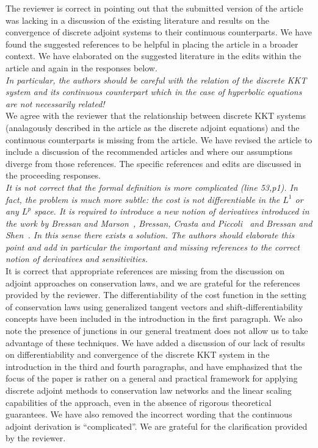 \documentclass[10pt]{article}
\begin{document}
The reviewer is correct in pointing out that the submitted version of the article was lacking in a discussion of the existing literature and results on the convergence of discrete adjoint systems to their continuous counterparts. We have found the suggested references to be helpful in placing the article in a broader context. We have elaborated on the suggested literature in the edits within the article and again in the responses below.\\

\emph{In particular,
the authors should be careful with the relation of the discrete KKT system and its continuous
counterpart which in the case of hyperbolic equations are not necessarily related!}\\

We agree with the reviewer that the relationship between discrete KKT systems (analagously described in the article as the discrete adjoint equations) and the continuous counterparts is missing from the article. We have revised the article to include a discussion of the recommended articles and where our assumptions diverge from those references. The specific references and edits are discussed in the proceeding responses.\\

\emph{It is not correct that the formal definition is more complicated (line 53,p1).
In fact, the problem is much more subtle: the cost is not differentiable in the $L^1$ or
any $L^p$ space. It is required to introduce a new notion of derivatives introduced
in the work by Bressan and Marson~\cite{bressan1995variational}, Bressan, Crasta and Piccoli~\cite{Bressan2000WellPosedness} and Bressan and Shen~\cite{Bressan2007Optimality}.
 In this sense there exists a solution. The authors
should elaborate this point and add in particular the important and missing references
to the correct notion of derivatives and sensitivities.}\\

It is correct that appropriate references are missing from the discussion on adjoint approaches on conservation laws, and we are grateful for the references provided by the reviewer. The differentiability of the cost function in the setting of conservation laws using generalized tangent vectors and shift-differentiability concepts have been included in the introduction in the first paragraph. We also note the presence of junctions in our general treatment does not allow us to take advantage of these techniques. We have added a discussion of our lack of results on differentiability and convergence of the discrete KKT system in the introduction in the third and fourth paragraphs, and have emphasized that the focus of the paper is rather on a general and practical framework for applying discrete adjoint methods to conservation law networks and the linear scaling capabilities of the approach, even in the absence of rigorous theoretical guarantees. We have also removed the incorrect wording that the continuous adjoint derivation is ``complicated''. We are grateful for the clarification provided by the reviewer.\\
\end{document}
